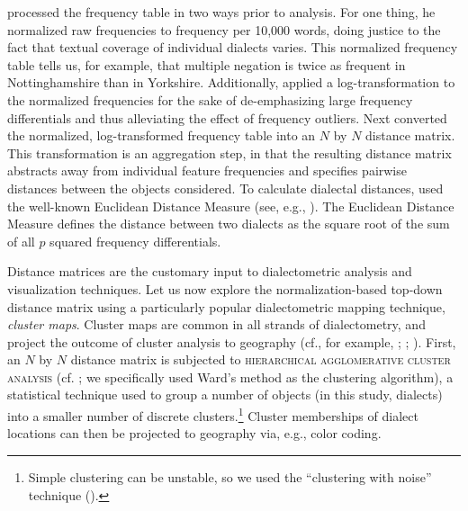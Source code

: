 \documentclass[output=paper]{LSP/langsci}
\begin{document}
\citet{szmrecsanyi_grammatical_2013} processed the frequency table in two ways prior to analysis. For one thing, he normalized raw frequencies to frequency per 10,000 words, doing justice to the fact that textual coverage of individual dialects varies. This normalized frequency table tells us, for example, that multiple negation is twice as frequent in Nottinghamshire than in Yorkshire. Additionally, \citeauthor{szmrecsanyi_grammatical_2013} applied a log-transformation to the normalized frequencies for the sake of de-emphasizing large frequency differentials and thus alleviating the effect of frequency outliers. Next \citeauthor{szmrecsanyi_grammatical_2013} converted the normalized, log-transformed frequency table into an $N$ by $N$ distance matrix. This transformation is an aggregation step, in that the resulting distance matrix abstracts away from individual feature frequencies and specifies pairwise distances between the objects considered. To calculate dialectal distances, \citeauthor{szmrecsanyi_grammatical_2013} used the well-known Euclidean Distance Measure (see, e.g., \citealt[25]{aldenderfer_cluster_1984}). The Euclidean Distance Measure defines the distance between two dialects as the square root of the sum of all $p$ squared frequency differentials.

Distance matrices are the customary input to dialectometric analysis and visualization techniques. Let us now explore the normalization-based top-down distance matrix using a particularly popular dialectometric mapping technique, \emph{cluster maps}. Cluster maps are common in all strands of dialectometry, and project the outcome of cluster analysis to geography (cf., for example, \citealt[Map 18]{goebl_bunch_2007}; \citealt[Figure 5]{nerbonne_dialektklassifikation_2005}; \citealt[Figure 9.6]{heeringa_measuring_2004}). First, an $N$ by $N$ distance matrix is subjected to \textsc{hierarchical agglomerative cluster analysis} (cf. \citealt{jain_data_1999}; we specifically used Ward's method as the clustering algorithm), a statistical technique used to group a number of objects (in this study, dialects) into a smaller number of discrete clusters.\footnote{Simple clustering can be unstable, so we used the ``clustering with noise'' technique (\citealt{nerbonne_projecting_2008}).} Cluster memberships of dialect locations can then be projected to geography via, e.g., color coding.
\end{document}
